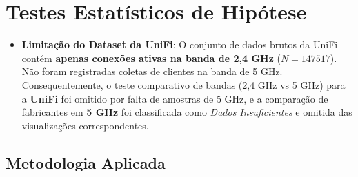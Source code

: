 \section{Testes Estatísticos de Hipótese}

\begin{itemize}
  \item \textbf{Limitação do Dataset da UniFi}:
    O conjunto de dados brutos da UniFi contém \textbf{apenas conexões ativas na banda de 2,4 GHz} ($N = 147517$). Não foram registradas coletas de clientes na banda de 5 GHz. Consequentemente, o teste comparativo de bandas (2,4 GHz vs 5 GHz) para a \textbf{UniFi} foi omitido por falta de amostras de 5 GHz, e a comparação de fabricantes em \textbf{5 GHz} foi classificada como \textit{Dados Insuficientes} e omitida das visualizações correspondentes.


\end{itemize}
\subsection{Metodologia Aplicada}


